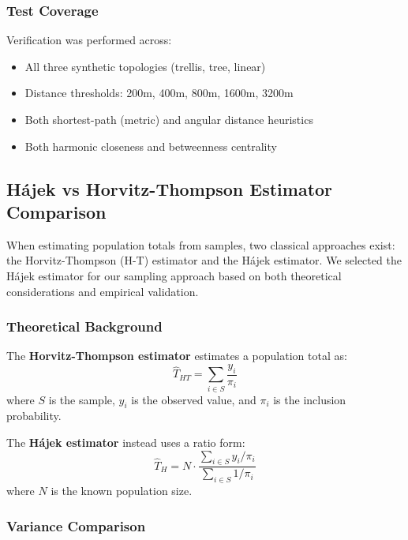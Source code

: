 \documentclass[11pt,a4paper]{article}
\begin{document}
\subsubsection{Test Coverage}

Verification was performed across:
\begin{itemize}
    \item All three synthetic topologies (trellis, tree, linear)
    \item Distance thresholds: 200m, 400m, 800m, 1600m, 3200m
    \item Both shortest-path (metric) and angular distance heuristics
    \item Both harmonic closeness and betweenness centrality
\end{itemize}


\subsection{H\'{a}jek vs Horvitz-Thompson Estimator Comparison}
\label{sec:estimator_comparison}

When estimating population totals from samples, two classical approaches exist: the Horvitz-Thompson (H-T) estimator and the H\'{a}jek estimator. We selected the H\'{a}jek estimator for our sampling approach based on both theoretical considerations and empirical validation.

\subsubsection{Theoretical Background}

The \textbf{Horvitz-Thompson estimator} \citep{Horvitz1952} estimates a population total as:
\begin{equation}
    \hat{T}_{HT} = \sum_{i \in S} \frac{y_i}{\pi_i}
\end{equation}
where $S$ is the sample, $y_i$ is the observed value, and $\pi_i$ is the inclusion probability.

The \textbf{H\'{a}jek estimator} \citep{Hajek1971} instead uses a ratio form:
\begin{equation}
    \hat{T}_{H} = N \cdot \frac{\sum_{i \in S} y_i / \pi_i}{\sum_{i \in S} 1 / \pi_i}
\end{equation}
where $N$ is the known population size.

\subsubsection{Variance Comparison}
\end{document}
